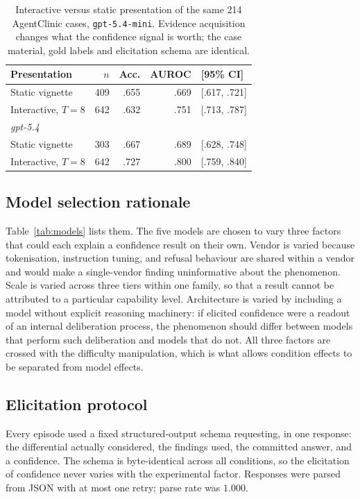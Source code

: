 \documentclass[journal,twoside]{IEEEtran}
\begin{document}
\begin{table}[!htb]
\caption{Interactive versus static presentation of the same 214 AgentClinic cases,
\texttt{gpt-5.4-mini}. Evidence acquisition changes what the confidence signal is worth; the case
material, gold labels and elicitation schema are identical.}
\label{tab:intvsstatic}
\centering
\small
\begin{tabular}{lrrrl}
\toprule
Presentation & $n$ & Acc. & AUROC & [95\% CI] \\
\midrule
Static vignette & 409 & .655 & .669 & [.617, .721] \\
Interactive, $T=8$ & 642 & .632 & .751 & [.713, .787] \\
\midrule
\multicolumn{5}{l}{\emph{gpt-5.4}}\\
Static vignette & 303 & .667 & .689 & [.628, .748] \\
Interactive, $T=8$ & 642 & .727 & .800 & [.759, .840] \\
\bottomrule
\end{tabular}
\end{table}

\subsection{Model selection rationale}
Table~\ref{tab:models} lists them. The five models are chosen to vary three factors that could each explain a confidence result on
their own. Vendor is varied because tokenisation, instruction tuning, and refusal behaviour are
shared within a vendor and would make a single-vendor finding uninformative about the phenomenon.
Scale is varied across three tiers within one family, so that a result cannot be attributed to a
particular capability level. Architecture is varied by including a model without explicit reasoning
machinery: if elicited confidence were a readout of an internal deliberation process, the phenomenon
should differ between models that perform such deliberation and models that do not. All three
factors are crossed with the difficulty manipulation, which is what allows condition effects to be
separated from model effects.

\subsection{Elicitation protocol}
Every episode used a fixed structured-output schema requesting, in one response: the differential
actually considered, the findings used, the committed answer, and a
confidence. The schema is byte-identical across all conditions, so the
elicitation of confidence never varies with the experimental factor. Responses were parsed from JSON
with at most one retry; parse rate was $1.000$.
\end{document}
